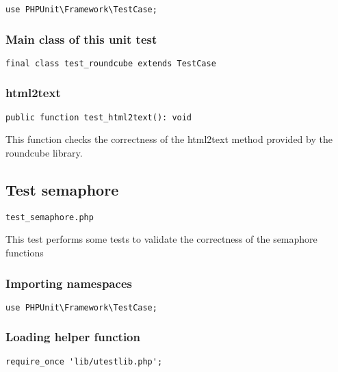 \documentclass[a4paper]{article}
\begin{document}
\begin{lstlisting}
use PHPUnit\Framework\TestCase;
\end{lstlisting}

\hypertarget{toc321}{}
\subsubsection{Main class of this unit test}

\begin{lstlisting}
final class test_roundcube extends TestCase
\end{lstlisting}

\hypertarget{toc322}{}
\subsubsection{html2text}

\begin{lstlisting}
public function test_html2text(): void
\end{lstlisting}

This function checks the correctness of the html2text method provided by the
roundcube library.

\hypertarget{toc323}{}
\subsection{Test semaphore}

\begin{lstlisting}
test_semaphore.php
\end{lstlisting}

This test performs some tests to validate the correctness
of the semaphore functions

\hypertarget{toc324}{}
\subsubsection{Importing namespaces}

\begin{lstlisting}
use PHPUnit\Framework\TestCase;
\end{lstlisting}

\hypertarget{toc325}{}
\subsubsection{Loading helper function}

\begin{lstlisting}
require_once 'lib/utestlib.php';
\end{lstlisting}
\end{document}
